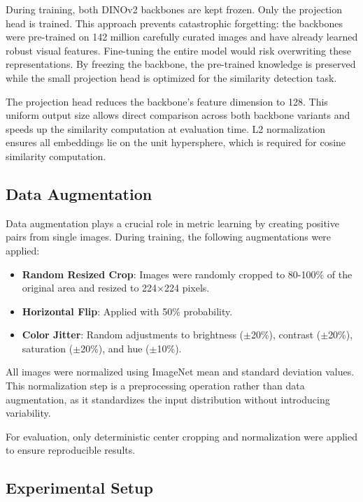 \documentclass[
    english,
]{VUMIFPSbakalaurinis}
\begin{document}
During training, both DINOv2 backbones are kept frozen. Only the projection head is trained. This approach prevents catastrophic forgetting: the backbones were pre-trained on 142 million carefully curated images and have already learned robust visual features. Fine-tuning the entire model would risk overwriting these representations. By freezing the backbone, the pre-trained knowledge is preserved while the small projection head is optimized for the similarity detection task.

The projection head reduces the backbone's feature dimension to 128. This uniform output size allows direct comparison across both backbone variants and speeds up the similarity computation at evaluation time. L2 normalization ensures all embeddings lie on the unit hypersphere, which is required for cosine similarity computation.

\subsection{Data Augmentation}

Data augmentation plays a crucial role in metric learning by creating positive pairs from single images. During training, the following augmentations were applied:

\begin{itemize}
    \item \textbf{Random Resized Crop}: Images were randomly cropped to 80-100\% of the original area and resized to 224$\times$224 pixels.
    \item \textbf{Horizontal Flip}: Applied with 50\% probability.
    \item \textbf{Color Jitter}: Random adjustments to brightness ($\pm$20\%), contrast ($\pm$20\%), saturation ($\pm$20\%), and hue ($\pm$10\%).
\end{itemize}

All images were normalized using ImageNet mean and standard deviation values. This normalization step is a preprocessing operation rather than data augmentation, as it standardizes the input distribution without introducing variability.

For evaluation, only deterministic center cropping and normalization were applied to ensure reproducible results.

\subsection{Experimental Setup}
\end{document}
